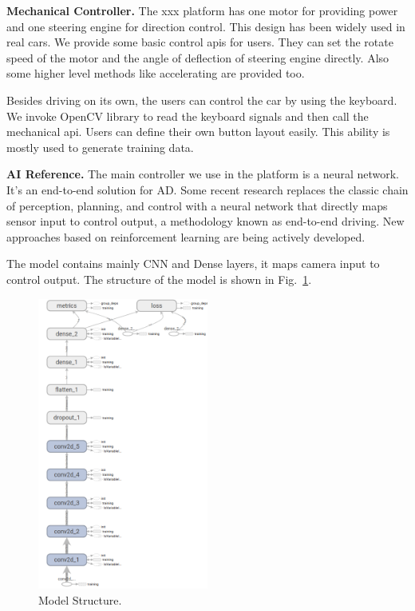\documentclass[conference]{IEEEtran}
\begin{document}
\textbf{Mechanical Controller.} The xxx platform has one motor for providing power and one steering engine for direction control. This design has been widely used in real cars. We provide some basic control apis for users. They can set the rotate speed of the motor and the angle of deflection of steering engine directly. Also some higher level methods like accelerating are provided too. 

Besides driving on its own, the users can control the car by using the keyboard. We invoke OpenCV\cite{b20} library to read the keyboard signals and then call the mechanical api. Users can define their own button layout easily. This ability is mostly used to generate training data.

\textbf{AI Reference.} The main controller we use in the platform is a neural network. It's an end-to-end solution for AD. Some recent research replaces the classic chain of perception, planning, and control with a neural network that directly maps sensor input to control output\cite{b21, b22, b23}, a methodology known as end-to-end driving. New approaches based on reinforcement learning are being actively developed\cite{b24}.

The model contains mainly CNN and Dense layers\cite{b25}, it maps camera input to control output. The structure of the model is shown in Fig.~\ref{ms}.

\begin{figure}[htbp]
\centerline{\includegraphics[width=0.5\textwidth,height=0.5\textheight]{net-structure.png}}
\caption{Model Structure.}
\label{ms}
\end{figure}
\end{document}
